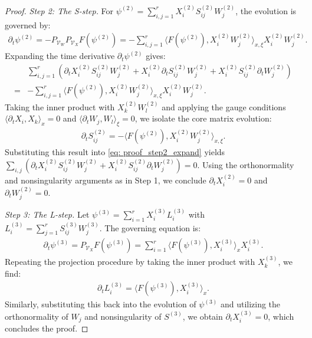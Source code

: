 \documentclass[preprint,11pt]{elsarticle}
\begin{document}
\begin{proof}
    \textit{Step 2: The S-step.} 
    For $\psi^{(2)} = \sum_{i,j=1}^r X_i^{(2)} S_{ij}^{(2)} W_j^{(2)}$, the evolution is governed by:
    \begin{align*}
        \partial_t \psi^{(2)} = -P_{\mathcal{V}_W} P_{\mathcal{V}_X} F(\psi^{(2)}) = -\sum_{i,j=1}^r \langle F(\psi^{(2)}), X_i^{(2)} W_j^{(2)} \rangle_{x,\xi} X_i^{(2)} W_j^{(2)}.
    \end{align*}
    Expanding the time derivative $\partial_t \psi^{(2)}$ gives:
    \begin{equation}\label{eq: proof_step2_expand}
    \begin{aligned}
        &\sum_{i,j=1}^r \left( \partial_t X_i^{(2)} S_{ij}^{(2)} W_j^{(2)} + X_i^{(2)} \partial_t S_{ij}^{(2)} W_j^{(2)} + X_i^{(2)} S_{ij}^{(2)} \partial_t W_j^{(2)} \right) \\
        =& -\sum_{i,j=1}^r \langle F(\psi^{(2)}), X_i^{(2)} W_j^{(2)} \rangle_{x,\xi} X_i^{(2)} W_j^{(2)}.
    \end{aligned}
    \end{equation}
    Taking the inner product with $X_k^{(2)} W_l^{(2)}$ and applying the gauge conditions $\langle \partial_t X_i, X_k \rangle_x = 0$ and $\langle \partial_t W_j, W_l \rangle_\xi = 0$, we isolate the core matrix evolution:
    \begin{align*}
        \partial_t S_{ij}^{(2)} = -\langle F(\psi^{(2)}), X_i^{(2)} W_j^{(2)} \rangle_{x,\xi}.
    \end{align*}
    Substituting this result into \eqref{eq: proof_step2_expand} yields $\sum_{i,j} (\partial_t X_i^{(2)} S_{ij}^{(2)} W_j^{(2)} + X_i^{(2)} S_{ij}^{(2)} \partial_t W_j^{(2)}) = 0$. Using the orthonormality and nonsingularity arguments as in Step 1, we conclude $\partial_t X_i^{(2)} = 0$ and $\partial_t W_j^{(2)} = 0$.

    \textit{Step 3: The L-step.} 
    Let $\psi^{(3)} = \sum_{i=1}^r X_i^{(3)} L_i^{(3)}$ with $L_i^{(3)} = \sum_{j=1}^r S_{ij}^{(3)} W_j^{(3)}$. The governing equation is:
    \begin{align*}
        \partial_t \psi^{(3)} = P_{\mathcal{V}_X} F(\psi^{(3)}) = \sum_{i=1}^r \langle F(\psi^{(3)}), X_i^{(3)} \rangle_{x} X_i^{(3)}.
    \end{align*}
    Repeating the projection procedure by taking the inner product with $X_k^{(3)}$, we find:
    \begin{align*}
        \partial_t L_i^{(3)} = \langle F(\psi^{(3)}), X_i^{(3)} \rangle_{x}.
    \end{align*}
    Similarly, substituting this back into the evolution of $\psi^{(3)}$ and utilizing the orthonormality of $W_j$ and nonsingularity of $S^{(3)}$, we obtain $\partial_t X_i^{(3)} = 0$, which concludes the proof.
\end{proof}
\end{document}
